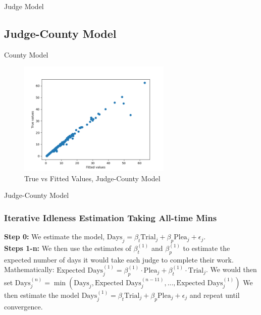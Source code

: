 \documentclass[11pt, oneside]{article}   	%
\theoremstyle{ModifiedStyle}
\begin{document}
		    \begin{table}[H]
		      \centering
		      \caption{Judge Model}
		      
		    \end{table}

		  \subsection{Judge-County Model}

		    \begin{table}[H]
		      \centering
		      \caption{County Model}
		      
		    \end{table}

		    \begin{figure}[H]
		      \centering
		      \includegraphics[width=0.65\textwidth]{../../output/figures/Exploration/fit_min_JudgeIDCounty}
		      \caption{True vs Fitted Values, Judge-County Model}
		    \end{figure}

		    \begin{table}[H]
		      \centering
		      \caption{Judge-County Model}
		      
		    \end{table}

		\subsubsection{Iterative Idleness Estimation Taking All-time Mins}
			\textbf{Step 0:} We estimate the model, $\text{Days}_j = \beta_t\text{Trial}_j + \beta_p\text{Plea}_j +\epsilon_j$. \\

		  \noindent \textbf{Steps 1-n:} We then use the estimates of $\beta^{(1)}_t$ and $\beta^{(1)}_p$ to estimate the expected number
		  of days it would take each judge to complete their work. Mathematically: $\text{Expected Days}^{(1)}_j = \beta^{(1)}_p \cdot \text{Plea}_j + \beta^{(1)}_t \cdot \text{Trial}_j$.
		  We would then set $\text{Days}^{(n)}_j = \min(\text{Days}_j,\text{Expected Days}^{(n-11)}_j,...,\text{Expected Days}^{(1)}_j)$ We then estimate the model $\text{Days}^{(1)}_j = \beta_t\text{Trial}_j + \beta_p\text{Plea}_j +\epsilon_j$ and repeat until convergence.
\end{document}
